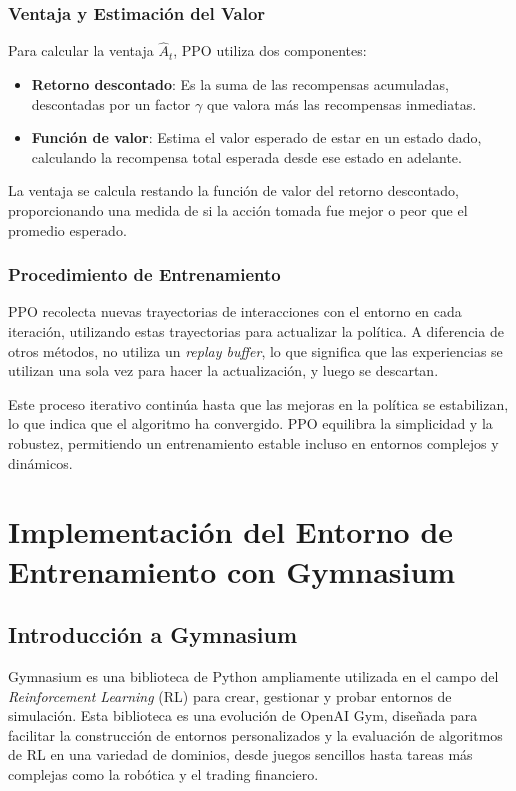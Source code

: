 \documentclass[a4paper,12pt, twoside]{report}
\begin{document}
\subsubsection{Ventaja y Estimación del Valor}

Para calcular la ventaja \(\hat{A}_t\), PPO utiliza dos componentes:

\begin{itemize}
    \item \textbf{Retorno descontado}: Es la suma de las recompensas acumuladas, descontadas 
    por un factor \(\gamma\) que valora más las recompensas inmediatas.
    \item \textbf{Función de valor}: Estima el valor esperado de estar en un estado dado, 
    calculando la recompensa total esperada desde ese estado en adelante.
\end{itemize}

La ventaja se calcula restando la función de valor del retorno descontado, proporcionando 
una medida de si la acción tomada fue mejor o peor que el promedio esperado.

\subsubsection{Procedimiento de Entrenamiento}

PPO recolecta nuevas trayectorias de interacciones con el entorno en cada iteración, 
utilizando estas trayectorias para actualizar la política. A diferencia de otros métodos, 
no utiliza un \textit{replay buffer}, lo que significa que las experiencias se utilizan 
una sola vez para hacer la actualización, y luego se descartan.

Este proceso iterativo continúa hasta que las mejoras en la política se estabilizan, 
lo que indica que el algoritmo ha convergido. PPO equilibra la simplicidad y la robustez, 
permitiendo un entrenamiento estable incluso en entornos complejos y dinámicos.

\section{Implementación del Entorno de Entrenamiento con Gymnasium}

\subsection{Introducción a Gymnasium}

Gymnasium es una biblioteca de Python ampliamente utilizada en el campo del 
\textit{Reinforcement Learning} (RL) para crear, gestionar y probar entornos 
de simulación. Esta biblioteca es una evolución de OpenAI Gym, diseñada para 
facilitar la construcción de entornos personalizados y la evaluación de algoritmos 
de RL en una variedad de dominios, desde juegos sencillos hasta tareas más complejas 
como la robótica y el trading financiero.
\end{document}
